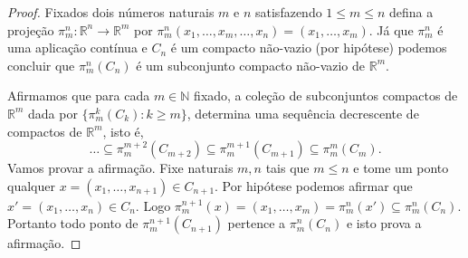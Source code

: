 \begin{proof}
Fixados dois números naturais $m$ e $n$ satisfazendo 
$1\leq m\leq n$ defina a projeção
$\pi^{n}_{m}:\mathbb{R}^n\to\mathbb{R}^m$ por 
$\pi^{n}_{m}(x_1,\ldots,x_m,\ldots,x_n)=(x_1,\ldots,x_m)$.
Já que $\pi^{n}_{m}$ é uma aplicação contínua e 
$C_n$ é um compacto não-vazio (por hipótese) podemos concluir que 
$\pi^{n}_{m}(C_n)$ é um subconjunto compacto não-vazio 
de $\mathbb{R}^m$.

Afirmamos que para cada $m\in\mathbb{N}$ fixado, 
a coleção de subconjuntos compactos 
de $\mathbb{R}^m$ dada por 
$\{\pi^{k}_{m}(C_k): k\geq m\}$, determina uma 
sequência decrescente de compactos de $\mathbb{R}^m$,
isto é,
\begin{equation}\label{continencia-pikm-Cm}
\ldots \subseteq 
\pi^{m+2}_{m}(C_{m+2})\subseteq
\pi^{m+1}_{m}(C_{m+1})\subseteq \pi_{m}^m(C_m).
\end{equation}
Vamos provar a afirmação. Fixe naturais $m,n$ tais que 
$m\leq n$ e tome um ponto qualquer 
$x =(x_1,\ldots,x_{n+1})\in C_{n+1}$. Por hipótese 
podemos afirmar que $x'=(x_1,\ldots,x_n)\in C_n$. 
Logo 
$
\pi^{n+1}_{m}(x)
=(x_1,\ldots,x_m)
=\pi^{n}_{m}(x')
\subseteq \pi^{n}_{m}(C_n)
$.
Portanto todo ponto de $\pi^{n+1}_{m}(C_{n+1})$ pertence 
a $\pi^{n}_{m}(C_n)$ e isto prova a afirmação.


\end{proof}
